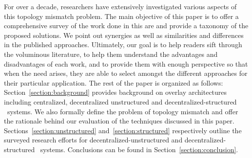 For over a decade, researchers have extensively investigated  
various aspects of this topology mismatch problem.  
The main objective of this paper is to offer a comprehensive 
survey of the work done in this are and provide a
taxonomy of the proposed solutions. We point out synergies as well as
similarities and differences in the published approaches. 
Ultimately, our goal is to help readers sift through 
the voluminous literature, to help them
understand the advantages and disadvantages of each work, and 
to provide them with enough perspective so that 
when the need arises, they are able to
select amongst the different approaches for their particular application.
The rest of the paper is organized as follows: 
Section~\ref{section:background} provides background on
overlay architectures including centralized, decentralized
unstructured and decentralized-structured \p\ systems. 
We also formally define the problem of topology mismatch 
and offer the rationale behind our 
evaluation of the techniques discussed in this paper. 
Sections~\ref{section:unstructured} and~\ref{section:structured}
respectively outline the surveyed research efforts 
for decentralized-unstructured and decentralized-structured \p\ systems.
Conclusions can be found in Section~\ref{section:conclusion}.
